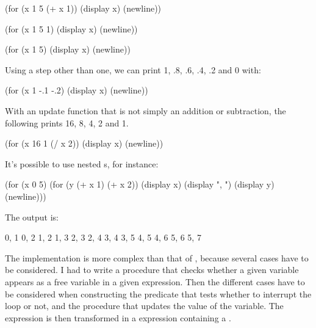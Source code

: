 \begin{exe}[4.9]
\begin{itemize}
\begin{cscm}
                (for (x 1 5 (+ x 1)) (display x) (newline))

                (for (x 1 5 1) (display x) (newline))

                (for (x 1 5) (display x) (newline))
            \end{cscm}
            Using a step other than one, we can print 1, .8, .6, .4, .2 and 
            0 with:
            \begin{cscm}
                (for (x 1 -.1 -.2)
                    (display x) (newline))
            \end{cscm}
            With an update function that is not simply an addition or 
            subtraction, the following prints 16, 8, 4, 2 and 1.
            \begin{cscm}
                (for (x 16 1 (/ x 2))
                    (display x) (newline))
            \end{cscm}
            It’s possible to use nested s, for instance:
            \begin{cscm}
            (for (x 0 5)
                (for (y (+ x 1) (+ x 2))
                    (display x)
                    (display ", ")
                    (display y)
                    (newline)))
            \end{cscm}
            The output is:
            \begin{cscm}
                0, 1
                0, 2
                1, 2
                1, 3
                2, 3
                2, 4
                3, 4
                3, 5
                4, 5
                4, 6
                5, 6
                5, 7
            \end{cscm}
    \end{itemize}
    The implementation is more complex than that of , because 
    several cases have to be considered. I had to write a procedure that checks 
    whether a given variable appears as a free variable in a given expression. 
    Then the different cases have to be considered when constructing the 
    predicate that tests whether to interrupt the loop or not, and the procedure 
    that updates the value of the variable. The  expression is then 
    transformed in a  expression containing a .
\end{exe}

